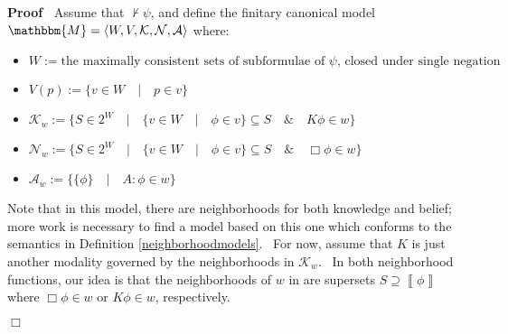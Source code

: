 \documentclass{acmconf}
\newcommand{\assign}{:=}
\newenvironment{itemizedot}{\begin{itemize} \renewcommand{\labelitemi}{$\bullet$}\renewcommand{\labelitemii}{$\bullet$}\renewcommand{\labelitemiii}{$\bullet$}\renewcommand{\labelitemiv}{$\bullet$}}{\end{itemize}}
\newenvironment{proof}{\noindent\textbf{Proof\ }}{\hspace*{\fill}$\Box$\medskip}
\begin{document}
\begin{proof}
  Assume that $\nvdash \psi$, and define the finitary canonical model
  $\mathbbm{M}= \langle W, V, \mathcal{K}, \mathcal{N}, \mathcal{A} \rangle$
  where:
  \begin{itemizedot}
    \item $W \assign \text{the maximally consistent sets of subformulae of
    $\psi$, closed under single negation}$
    
    \item $V (p) \assign \{v \in W \hspace{1em} | \hspace{1em} p \in v\}$
    
    \item $\mathcal{K}_w \assign \{S \in 2^W \hspace{1em} | \hspace{1em} \{v
    \in W \hspace{1em} | \hspace{1em} \phi \in v\} \subseteq S \hspace{1em} \&
    \hspace{1em} K \phi \in w\}$
    
    \item $\mathcal{N}_w \assign \{S \in 2^W \hspace{1em} | \hspace{1em} \{v
    \in W \hspace{1em} | \hspace{1em} \phi \in v\} \subseteq S \hspace{1em} \&
    \hspace{1em} \Box \phi \in w\}$
    
    \item $\mathcal{A}_w \assign \{\{\phi\} \hspace{1em} | \hspace{1em} A :
    \phi \in w\}$
  \end{itemizedot}
  Note that in this model, there are neighborhoods for both knowledge and
  belief; more work is necessary to find a model based on this one which
  conforms to the semantics in Definition \ref{neighborhoodmodels}. \ For now,
  assume that $K$ is just another modality governed by the neighborhoods in
  $\mathcal{K}_w$. \ In both neighborhood functions, our idea is that the
  neighborhoods of $w$ in are supersets $S \supseteq \left\llbracket \phi
  \right\rrbracket$ where $\Box \phi \in w$ or $K \phi \in w$, respectively.
  
  
  

\end{proof}
\end{document}
